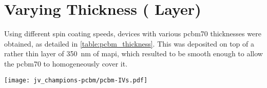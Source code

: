 \section{Varying  Thickness ( Layer)}
	Using different spin coating speeds, devices with various \gls{pcbm70} thicknesses were obtained, as detailed in \cref{table:pcbm_thickness}.
	This was deposited on top of a rather thin layer of \SI{350}{\nm} of \gls{mapi}, which resulted to be smooth enough to allow the \gls{pcbm70} to homogeneously cover it.

	\begin{SCfigure}
		\centering
		\texttt{[image: jv\_champions-pcbm/pcbm-IVs.pdf]}
		\label{fig:thicknesses-jv_champions-pcbm}
	\end{SCfigure}

